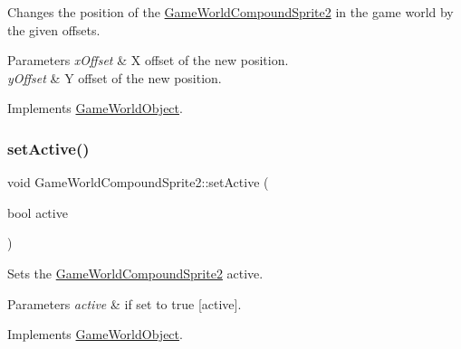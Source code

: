 Changes the position of the \hyperlink{class_game_world_compound_sprite2}{Game\+World\+Compound\+Sprite2} in the game world by the given offsets. 


\begin{DoxyParams}{Parameters}
{\em x\+Offset} & X offset of the new position.\\
\hline
{\em y\+Offset} & Y offset of the new position.\\
\hline
\end{DoxyParams}


Implements \hyperlink{class_game_world_object_a3ddbcf57e6eb43cb4aaec7ac347d4e17}{Game\+World\+Object}.

\mbox{\label{class_game_world_compound_sprite2_a773426feff97b69af22941f84a7ee40c}} 
\subsubsection{\texorpdfstring{set\+Active()}{setActive()}}
{\footnotesize\ttfamily void Game\+World\+Compound\+Sprite2\+::set\+Active (\begin{DoxyParamCaption}\item[{bool}]{active }\end{DoxyParamCaption})\hspace{0.3cm}{\ttfamily [virtual]}}



Sets the \hyperlink{class_game_world_compound_sprite2}{Game\+World\+Compound\+Sprite2} active. 


\begin{DoxyParams}{Parameters}
{\em active} & if set to {\ttfamily true} \mbox{[}active\mbox{]}.\\
\hline
\end{DoxyParams}


Implements \hyperlink{class_game_world_object_a79d89ff68b9334b454300cf855719b77}{Game\+World\+Object}.

\mbox{\label{class_game_world_compound_sprite2_a068bdce311f91566550409016df88489}} 
